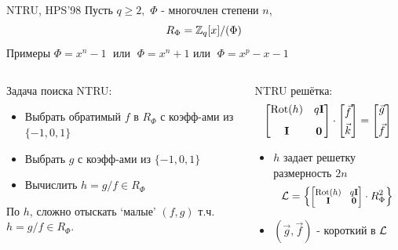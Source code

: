 \documentclass[usenames,dvipsnames, 9pt]{beamer}
\begin{document}
\newcommand{\colvec}[2][.8]{%
	\scalebox{#1}{%
		\renewcommand{\arraystretch}{.8}%
		$\begin{bmatrix}#2\end{bmatrix}$%
	}
}

\begin{frame}{NTRU, HPS'98}
	\Large
	Пусть $q \geq 2,$ $\Phi$ - многочлен степени $n$,
	\[
	R_\Phi = {{\mathbb Z}}_q[x]/(\Phi)
	\]
 	Примеры $\Phi = x^n-1 \;$  или  $ \;\Phi = x^n+1$ или  $ \; \Phi = x^p-x-1$ 
	\vspace{10pt}
	\begin{columns}
		\begin{column}{0.5\textwidth}
			{\color{Orange} Задача поиска NTRU:}
			\begin{itemize}
				\item Выбрать обратимый $f$ в $R_\Phi$ с коэфф-ами из $\{-1,0,1\}$
				\item Выбрать $g$ с коэфф-ами из $\{-1,0,1\}$
				\item Вычислить $h = g/f \in R_\Phi$
			\end{itemize}
			{\color{Orange}  По $h$, сложно отыскать `малые' $(f,g)$ т.ч.\ $h = g/f \in R_\Phi$.}
		\end{column}
		\pause
		\begin{column}{0.5\textwidth}
			{\color{Orange}NTRU решётка:}
			\[
			\begin{bmatrix}
				\text{Rot}(h)  & q\Id \\[10pt]
				\Id & \ZeroM
			\end{bmatrix}
			\cdot
			\begin{bmatrix}
				\vec{f} \\[4pt]
				\vec{k}
			\end{bmatrix}
			=
			\begin{bmatrix}
				\vec{g} \\[7pt]
				\vec{f}
			\end{bmatrix}
			\]
			\vspace{-10pt}
			\begin{itemize}
				\item $h$  задает решетку размерность $2n$ 
				\[\Lat = \Big\{ \colvec{ \text{Rot}(h) & q\Id \\ \Id & \ZeroM}  \cdot R_\Phi^2 \Big\} \]
				\item $(\vec{g}, \vec{f})$ - короткий в $\mathcal{L} $
			\end{itemize}
		\end{column}
	\end{columns}
	
\end{frame}
\end{document}
